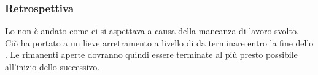 \subsubsection{Retrospettiva}
Lo  non è andato come ci si aspettava a causa della mancanza di lavoro svolto.
Ciò ha portato a un lieve arretramento a livello di  da terminare entro la fine dello . 
Le  rimanenti aperte dovranno quindi essere terminate al più presto possibile all'inizio dello  successivo.